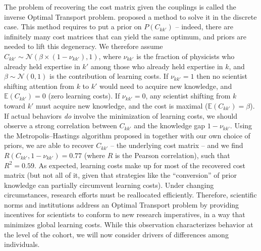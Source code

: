 \documentclass{article}
\begin{document}
The problem of recovering the cost matrix given the couplings is called the inverse Optimal Transport problem. \citet{Chu2021} proposed a method to solve it in the discrete case. This method requires to put a prior on $P(C_{kk'})$ -- indeed, there are infinitely many cost matrices that can yield the same optimum, and priors are needed to lift this degeneracy. We therefore assume $C_{kk'}\sim \mathcal{N}(\beta \times (1-\nu_{kk'}),1)$, where $\nu_{kk'}$ is the fraction of physicists who already held expertise in $k'$ among those who already held expertise in $k$, and $\beta\sim\mathcal{N}(0,1)$ is the contribution of learning costs. If $\nu_{kk'}=1$ then no scientist shifting attention from $k$ to $k'$ would need to acquire new knowledge, and $\mathbb{E}(C_{kk'})=0$ (zero learning costs). If $\nu_{kk'}=0$, any scientist shifting from $k$ toward $k'$ must acquire new knowledge, and the cost is maximal ($\mathbb{E}(C_{kk'})=\beta$). If actual behaviors \textit{do} involve the minimization of learning costs, we should observe a strong correlation between $C_{kk'}$ and the knowledge gap $1-\nu_{kk'}$.  Using the Metropolis–Hastings algorithm proposed in \citealt{Chu2021} together with our own choice of priors, we are able to recover $C_{kk'}$ -- the underlying cost matrix -- and we find $R(C_{kk'},1-\nu_{kk'})=0.77$ (where $R$ is the Pearson correlation), such that $R^2=0.59$. As expected, learning costs make up for most of the recovered cost matrix (but 
 not all of it, given that strategies like the ``conversion'' of prior knowledge can partially circumvent learning costs). Under changing circumstances, research efforts must be reallocated efficiently. Therefore, scientific norms and institutions address an Optimal Transport problem by providing incentives for scientists to conform to new research imperatives, in a way that minimizes global learning costs. While this observation characterizes behavior at the level of the cohort, we will now consider drivers of differences among individuals. 

\end{document}
